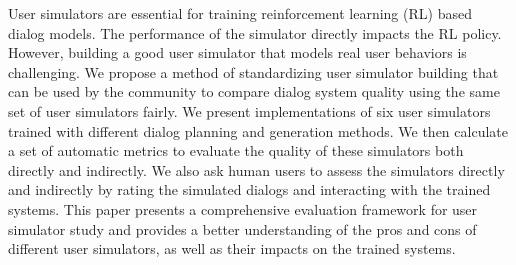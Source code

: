 User simulators are essential for training reinforcement learning (RL) based dialog models. The performance of the simulator directly impacts the RL policy. However, building a good user simulator that models real user behaviors is challenging. We propose a method of standardizing user simulator building that can be used by the community to compare dialog system quality using the same set of user simulators fairly.
We present implementations of six user simulators trained with different dialog planning and generation methods. We then calculate a set of automatic metrics to evaluate the quality of these simulators both directly and indirectly. We also ask human users to assess the simulators directly and indirectly by rating the simulated dialogs and interacting with the trained systems. This paper presents a comprehensive evaluation framework for user simulator study and provides a better understanding of the pros and cons of different user simulators, as well as their impacts on the trained systems.